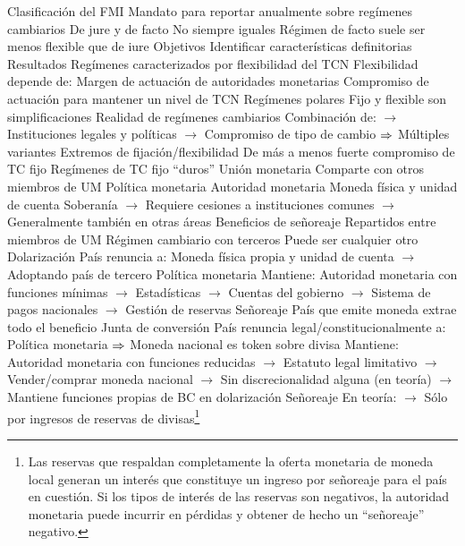 \documentclass{nuevotema}
\begin{document}
\begin{esquemal}
				\4 Clasificación del FMI
				\4[] Mandato para reportar anualmente sobre regímenes cambiarios
				\4 De jure y de facto
				\4[] No siempre iguales
				\4[] Régimen de facto suele ser menos flexible que de iure
			\3 Objetivos
				\4 Identificar características definitorias
			\3 Resultados
				\4 Regímenes caracterizados por flexibilidad del TCN
				\4 Flexibilidad depende de:
				\4[] Margen de actuación de autoridades monetarias
				\4[] Compromiso de actuación para mantener un nivel de TCN
				\4 Regímenes polares
				\4[] Fijo y flexible son simplificaciones
				\4 Realidad de regímenes cambiarios
				\4[] Combinación de:
				\4[] $\to$ Instituciones legales y políticas
				\4[] $\to$ Compromiso de tipo de cambio
				\4[] $\Rightarrow$ Múltiples variantes
				\4 Extremos de fijación/flexibilidad
				\4[] De más a menos fuerte compromiso de TC fijo
		\2 Regímenes de TC fijo ``duros''
			\3 Unión monetaria
				\4 Comparte con otros miembros de UM
				\4[] Política monetaria
				\4[] Autoridad monetaria
				\4[] Moneda física y unidad de cuenta
				\4[] Soberanía
				\4[] $\to$ Requiere cesiones a instituciones comunes
				\4[] $\to$ Generalmente también en otras áreas
				\4 Beneficios de señoreaje
				\4[] Repartidos entre miembros de UM
				\4 Régimen cambiario con terceros
				\4[] Puede ser cualquier otro
			\3 Dolarización
				\4 País renuncia a:
				\4[] Moneda física propia y unidad de cuenta
				\4[] $\to$ Adoptando país de tercero
				\4[] Política monetaria
				\4 Mantiene:
				\4[] Autoridad monetaria con funciones mínimas
				\4[] $\to$ Estadísticas
				\4[] $\to$ Cuentas del gobierno
				\4[] $\to$ Sistema de pagos nacionales
				\4[] $\to$ Gestión de reservas
				\4 Señoreaje
				\4[] País que emite moneda extrae todo el beneficio
			\3 Junta de conversión
				\4 País renuncia legal/constitucionalmente a:
				\4[] Política monetaria
				\4[] $\Rightarrow$ Moneda nacional es token sobre divisa
				\4 Mantiene:
				\4[] Autoridad monetaria con funciones reducidas
				\4[] $\to$ Estatuto legal limitativo
				\4[] $\to$ Vender/comprar moneda nacional
				\4[] $\to$ Sin discrecionalidad alguna (en teoría)
				\4[] $\to$ Mantiene funciones propias de BC en dolarización
				\4 Señoreaje
				\4[] En teoría:
				\4[] $\to$ Sólo por ingresos de reservas de divisas\footnote{Las reservas que respaldan completamente la oferta monetaria de moneda local generan un interés que constituye un ingreso por señoreaje para el país en cuestión. Si los tipos de interés de las reservas son negativos, la autoridad monetaria puede incurrir en pérdidas y obtener de hecho un ``señoreaje'' negativo.}

\end{esquemal}
\end{document}
